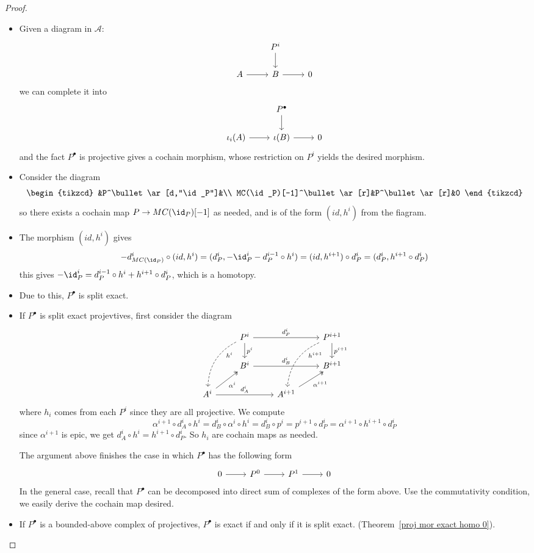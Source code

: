 \begin{proof}
\mbox{}
\begin{itemize}
\item Given a diagram in $\mathcal{A}$:
\[\begin{tikzcd}
&P^i\ar[d]&\\
A\ar[r]&B\ar[r]&0
\end{tikzcd}\]
we can complete it into
\[\begin{tikzcd}
&P^\bullet\ar[d]&\\
\iota_i(A)\ar[r]&\iota(B)\ar[r]&0
\end{tikzcd}\]
and the fact $P^\bullet$ is projective gives a cochain morphism, whose restriction on $P^i$ yields the desired morphism.
\item Consider the diagram
\[\begin{tikzcd}
&P^\bullet\ar[d,"\id_P"]&\\
MC(\id_P)[-1]^\bullet\ar[r]&P^\bullet\ar[r]&0
\end{tikzcd}\]
so there exists a cochain map $P\to MC(\id_P)[-1]$ as needed, and is of the form $(id,h^i)$ from the fiagram.
\item The morphism $(id,h^i)$ gives
\[-d^i_{MC(\id_P)}\circ(id,h^i)=(d_P^i,-\id_P^{i}-d_P^{i-1}\circ h^i)=(id,h^{i+1})\circ d_P^i=(d_P^i,h^{i+1}\circ d_P^i)\]
this gives $-\id_P^{i}=d_P^{i-1}\circ h^i+h^{i+1}\circ d_P^i$, which is a homotopy.
\item Due to this, $P^\bullet$ is split exact.
\item If $P^\bullet$ is split exact projevtives, first consider the diagram
\[\begin{tikzcd}
&P^i\ar[d,"p^i"]\ar[ldd,dashed,near start,bend right,"h^i"]\ar[rr,"d_P^{i}"]&&P^{i+1}\ar[d,"p^{i+1}"]\ar[ldd,dashed,bend right,near start,"h^{i+1}"]\\
&B^{i}\ar[rr,"d_B^i"]&&B^{i+1}\\
A^i\ar[ru,two heads,swap,"\alpha^i"]\ar[rr,"d_A^i"]&&A^{i+1}\ar[ru,two heads,swap,"\alpha^{i+1}"]
\end{tikzcd}\]
where $h_i$ comes from each $P^i$ since they are all projective. We compute
\[\alpha^{i+1}\circ d_A^i\circ h^i=d_B^i\circ\alpha^i\circ h^i=d_B^i\circ p^i=p^{i+1}\circ d_P^i=\alpha^{i+1}\circ h^{i+1}\circ d_P^i\]
since $\alpha^{i+1}$ is epic, we get $d_A^i\circ h^i=h^{i+1}\circ d_P^i$. So $h_i$ are cochain maps as needed.\par
The argument above finishes the case in which $P^\bullet$ has the following form
\[\begin{tikzcd}
0\ar[r]&P^0\ar[r]&P^1\ar[r]&0
\end{tikzcd}\]
In the general case, recall that $P^\bullet$ can be decomposed into direct sum of complexes of the form above. Use the commutativity condition, we easily derive the cochain map desired.
\item If $P^\bullet$ is a bounded-above complex of projectives, $P^\bullet$ is exact if and only if it is split exact. (Theorem~\ref{proj mor exact homo 0}).
\end{itemize}
\end{proof}

